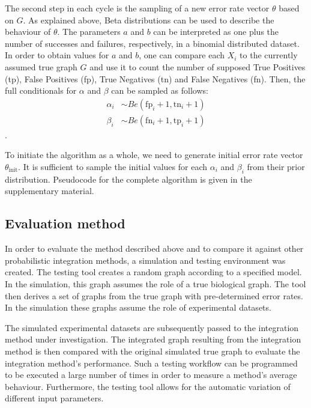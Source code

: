 \documentclass{bioinfo}
\begin{document}
\begin{methods}
The second step in each cycle is the sampling of a new error rate vector $\theta$ based on $G$. 
As explained above, Beta distributions can be used to describe the behaviour of $\theta$.
The parameters $a$ and $b$ can be interpreted as one plus the number of successes and failures, respectively, in a binomial distributed dataset. In order to obtain values for $a$ and $b$, one can compare each $X_i$ to the currently assumed true graph $G$ and use it to count the number of supposed True Positives (tp), False Positives (fp), True Negatives (tn) and False Negatives (fn). Then, the full conditionals for $\alpha$ and $\beta$ can be sampled as follows:
\begin{align}
  \alpha_i &\sim Be(\text{fp}_i+1, \text{tn}_i+1)\\
  \beta_i &\sim Be(\text{fn}_i+1, \text{tp}_i+1)
\end{align}.

To initiate the algorithm as a whole, we need to generate initial error rate vector $\theta_{\text{init}}$. It is sufficient to sample the initial values for each $\alpha_i$ and $\beta_i$ from their prior distribution.
Pseudocode for the complete algorithm is given in the supplementary material.



\subsection{Evaluation method}

In order to evaluate the method described above and to compare it against other probabilistic integration methods, a simulation and testing environment was created. The testing tool creates a random graph according to a specified model. In the simulation, this graph assumes the role of a true biological graph. The tool then derives a set of graphs from the true graph with pre-determined error rates. In the simulation these graphs assume the role of experimental datasets. 

The simulated experimental datasets are subsequently passed to the integration method under investigation. The integrated graph resulting from the integration method is then compared with the original simulated true graph to evaluate the integration method's performance. Such a testing workflow can be programmed to be executed a large number of times in order to measure a method's average behaviour. Furthermore, the testing tool allows for the automatic variation of different input parameters.


\end{methods}
\end{document}
